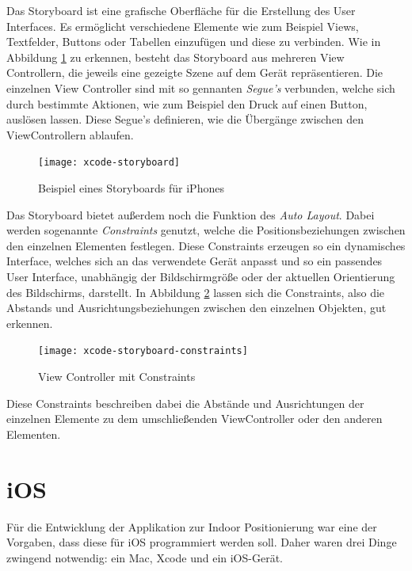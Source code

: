 Das Storyboard ist eine grafische Oberfläche für die Erstellung des User Interfaces. Es ermöglicht verschiedene Elemente wie zum Beispiel Views, Textfelder, Buttons oder Tabellen einzufügen und diese zu verbinden. Wie in Abbildung \ref{xcode-storyboard} zu erkennen, besteht das Storyboard aus mehreren View Controllern, die jeweils eine gezeigte Szene auf dem Gerät repräsentieren. Die einzelnen View Controller sind mit so gennanten \emph{Segue's} verbunden, welche sich durch bestimmte Aktionen, wie zum Beispiel den Druck auf einen Button, auslösen lassen. Diese Segue's definieren, wie die Übergänge zwischen den ViewControllern ablaufen.

\begin{figure}[htb!]
	\centering
	\texttt{[image: xcode-storyboard]}
	\caption{Beispiel eines Storyboards für iPhones}
	\label{xcode-storyboard}
\end{figure}

Das Storyboard bietet außerdem noch die Funktion des \emph{Auto Layout}. Dabei werden sogenannte \emph{Constraints} genutzt, welche die Positionsbeziehungen zwischen den einzelnen Elementen festlegen. Diese Constraints erzeugen so ein dynamisches Interface, welches sich an das verwendete Gerät anpasst und so ein passendes User Interface, unabhängig der Bildschirmgröße oder der aktuellen Orientierung des Bildschirms, darstellt.
In Abbildung \ref{xcode-storyboard-constraints} lassen sich die Constraints, also die Abstands und Ausrichtungsbeziehungen zwischen den einzelnen Objekten, gut erkennen.

\begin{figure}[htb!]
		\centering
	\texttt{[image: xcode-storyboard-constraints]}
	\caption{View Controller mit Constraints}
	\label{xcode-storyboard-constraints}
\end{figure}

Diese Constraints beschreiben dabei die Abstände und Ausrichtungen der einzelnen Elemente zu dem umschließenden ViewController oder den anderen Elementen.



\section{iOS}
\label{sec:technologies:iosandxcode}
Für die Entwicklung der Applikation zur Indoor Positionierung war eine der Vorgaben, dass diese für iOS programmiert werden soll.
Daher waren drei Dinge zwingend notwendig: ein Mac, Xcode und ein iOS-Gerät.

